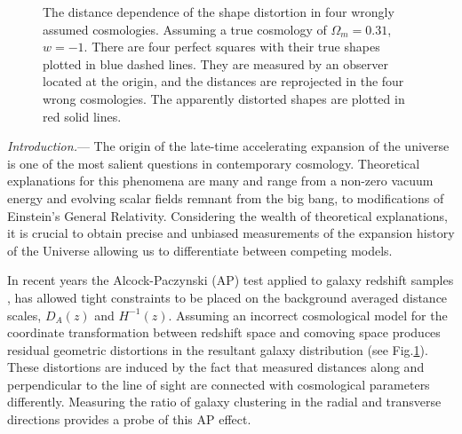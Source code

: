 \documentclass[prl,twocolumn,superscriptaddress,aps,amsmath,amssymb,nofootinbib,altaffilletter]{revtex4}
\begin{document}
\begin{figure}
   \caption{\label{fig_xy}
   The distance dependence of the shape distortion in four wrongly assumed cosmologies.
   Assuming a true cosmology of $\Omega_m=0.31$, $w=-1$.
   There are four perfect squares with their true shapes plotted in blue dashed lines.
   They are measured by an observer located at the origin, and the distances are reprojected in the four wrong cosmologies.
   The apparently distorted shapes are plotted in red solid lines.
   }
\end{figure}

{\it Introduction.}---
The  origin  of  the late-time accelerating  expansion  of  the  universe  is  one of  the  most  salient  questions  in  contemporary cosmology. 
Theoretical explanations for this phenomena are many and range from a non-zero  vacuum energy and evolving  scalar  fields  remnant  from  the  big  bang, 
to modifications of Einstein's General Relativity\cite{2012IJMPD..2130002Y}. 
Considering the wealth of theoretical explanations, 
it is crucial to obtain precise and unbiased measurements of the expansion history of the Universe allowing us to 
differentiate between competing models. 

In recent years the Alcock-Paczynski (AP) test \citep{AP1979} applied to galaxy redshift samples \citep{Outram2004,Blake2011,Alam2016}, 
has allowed tight constraints to be placed on the background averaged distance scales, $D_A(z)$ and $H^{-1}(z)$.  
Assuming an incorrect cosmological model for the coordinate transformation between redshift space and comoving space
produces residual geometric distortions in the resultant galaxy distribution (see  Fig.\ref{fig_xy}). 
These distortions are induced by the fact that measured distances along 
and perpendicular to the line of sight are connected with cosmological parameters differently. 
Measuring the ratio of galaxy clustering in the radial and transverse directions provides a probe of this AP effect.
\end{document}
